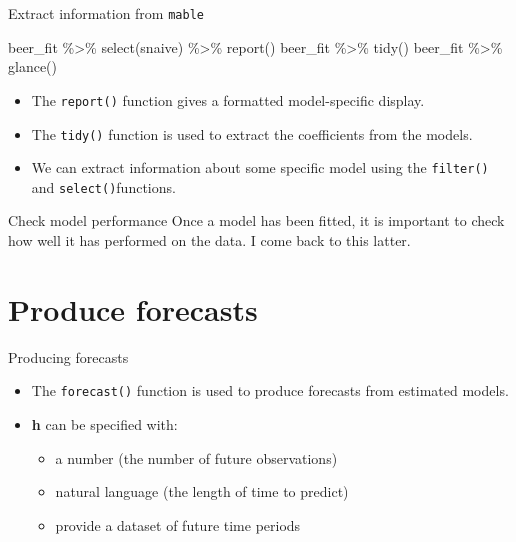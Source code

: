 \documentclass[
  14pt,
  ignorenonframetext,
  aspectratio=169,
]{beamer}
\newenvironment{Shaded}{\begin{snugshade}}{\end{snugshade}}
\newcommand{\FunctionTok}[1]{\textcolor[rgb]{0.00,0.00,0.00}{#1}}
\newcommand{\NormalTok}[1]{\textcolor[rgb]{0.00,0.00,0.00}{#1}}
\newcommand{\SpecialCharTok}[1]{\textcolor[rgb]{0.00,0.00,0.00}{#1}}
\providecommand{\tightlist}{%
  \setlength{\itemsep}{0pt}\setlength{\parskip}{0pt}}\usepackage{longtable,booktabs,array}
\renewenvironment{Shaded}{\vspace*{0.15cm}\color{black}\fontsize{10}{10}\sf\begin{snugshade}\color{black}}{\end{snugshade}}
\begin{document}
\begin{frame}[fragile]{Extract information from \texttt{mable}}
\protect\hypertarget{extract-information-from-mable}{}
\fontsize{10}{12}\sf

\begin{Shaded}
\begin{Highlighting}[]
\NormalTok{beer\_fit }\SpecialCharTok{\%\textgreater{}\%} \FunctionTok{select}\NormalTok{(snaive) }\SpecialCharTok{\%\textgreater{}\%} \FunctionTok{report}\NormalTok{()}
\NormalTok{beer\_fit }\SpecialCharTok{\%\textgreater{}\%} \FunctionTok{tidy}\NormalTok{()}
\NormalTok{beer\_fit }\SpecialCharTok{\%\textgreater{}\%} \FunctionTok{glance}\NormalTok{()}
\end{Highlighting}
\end{Shaded}

\begin{itemize}
\tightlist
\item
  The \texttt{report()} function gives a formatted model-specific
  display.
\item
  The \texttt{tidy()} function is used to extract the coefficients from
  the models.
\item
  We can extract information about some specific model using the
  \texttt{filter()} and \texttt{select()}functions.
\end{itemize}
\end{frame}

\begin{frame}{Check model performance}
\protect\hypertarget{check-model-performance}{}
Once a model has been fitted, it is important to check how well it has
performed on the data. I come back to this latter.
\end{frame}

\hypertarget{produce-forecasts}{%
\section{Produce forecasts}\label{produce-forecasts}}

\begin{frame}[fragile]{Producing forecasts}
\protect\hypertarget{producing-forecasts}{}
\begin{itemize}
\tightlist
\item
  The \texttt{forecast()} function is used to produce forecasts from
  estimated models.
\item
  \textbf{h} can be specified with:

  \begin{itemize}
  \tightlist
  \item
    a number (the number of future observations)
  \item
    natural language (the length of time to predict)
  \item
    provide a dataset of future time periods
  \end{itemize}
\end{itemize}
\end{frame}
\end{document}

